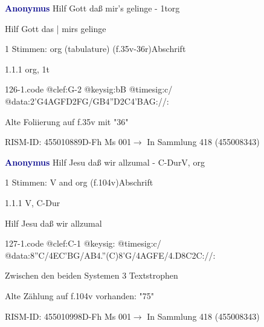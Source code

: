 \documentclass[twocolumn]{book}
\begin{document}
\par \vspace{7pt} \textcolor{darkblue}{\textbf{Anonymus  }}\hfillplus{\textbf{[126]}}\newline Hilf Gott daß mir's gelinge - 1t\newline org
\par \begin{itshape}[f.35v, at left:] Hilf Gott das | mirs gelinge\end{itshape} 
\par \textcolor{darkblue}{}  1 Stimmen: org (tabulature)  (f.35v-36r)\newline Abschrift
\par 1.1.1  org, 1t  
\begin{filecontents*}{126-1.code}
@clef:G-2
@keysig:bB
@timesig:c/
@data:2'G4AGFD2FG/GB4''D2C4'BAG://:
\end{filecontents*}
\newline
%
\par Alte Foliierung auf f.35v mit "36"
\par RISM-ID: 455010889\newline D-Fh  Ms 001\newline $\rightarrow$ In Sammlung 418 (455008343)
      
\par \vspace{7pt} \textcolor{darkblue}{\textbf{Anonymus  }}\hfillplus{\textbf{[127]}}\newline Hilf Jesu daß wir allzumal - C-Dur\newline V, org
\par \begin{itshape}\end{itshape} 
\par \textcolor{darkblue}{}  1 Stimmen: V and org  (f.104v)\newline Abschrift
\par 1.1.1  V, C-Dur\newline \begin{footnotesize} Hilf Jesu daß wir allzumal \end{footnotesize}  
\begin{filecontents*}{127-1.code}
@clef:C-1
@keysig:
@timesig:c/
@data:8''C/4EC'BG/AB4.''(C)8'G/4AGFE/4.D8C2C://:
\end{filecontents*}
\newline
%
\par Zwischen den beiden Systemen 3 Textstrophen
\par Alte Zählung auf f.104v vorhanden: "75"
\par RISM-ID: 455010998\newline D-Fh  Ms 001\newline $\rightarrow$ In Sammlung 418 (455008343)
      
\end{document}
